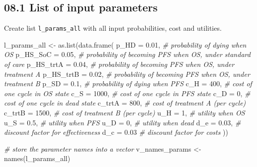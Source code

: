\documentclass[
]{article}
\newenvironment{Shaded}{\begin{snugshade}}{\end{snugshade}}
\newcommand{\AttributeTok}[1]{\textcolor[rgb]{0.77,0.63,0.00}{#1}}
\newcommand{\CommentTok}[1]{\textcolor[rgb]{0.56,0.35,0.01}{\textit{#1}}}
\newcommand{\DecValTok}[1]{\textcolor[rgb]{0.00,0.00,0.81}{#1}}
\newcommand{\FloatTok}[1]{\textcolor[rgb]{0.00,0.00,0.81}{#1}}
\newcommand{\FunctionTok}[1]{\textcolor[rgb]{0.00,0.00,0.00}{#1}}
\newcommand{\NormalTok}[1]{#1}
\newcommand{\OtherTok}[1]{\textcolor[rgb]{0.56,0.35,0.01}{#1}}
\begin{document}
\hypertarget{list-of-input-parameters}{%
\subsection{08.1 List of input
parameters}\label{list-of-input-parameters}}

Create list \texttt{l\_params\_all} with all input probabilities, cost
and utilities.

\begin{Shaded}
\begin{Highlighting}[]
\NormalTok{l\_params\_all }\OtherTok{\textless{}{-}} \FunctionTok{as.list}\NormalTok{(}\FunctionTok{data.frame}\NormalTok{(}
  \AttributeTok{p\_HD      =} \FloatTok{0.01}\NormalTok{,  }\CommentTok{\# probability of dying when OS}
  \AttributeTok{p\_HS\_SoC  =} \FloatTok{0.05}\NormalTok{,  }\CommentTok{\# probability of becoming PFS when OS, under standard of care}
  \AttributeTok{p\_HS\_trtA =} \FloatTok{0.04}\NormalTok{,  }\CommentTok{\# probability of becoming PFS when OS, under treatment A}
  \AttributeTok{p\_HS\_trtB =} \FloatTok{0.02}\NormalTok{,  }\CommentTok{\# probability of becoming PFS when OS, under treatment B}
  \AttributeTok{p\_SD      =} \FloatTok{0.1}\NormalTok{,   }\CommentTok{\# probability of dying when PFS}
  \AttributeTok{c\_H       =} \DecValTok{400}\NormalTok{,   }\CommentTok{\# cost of one cycle in OS state}
  \AttributeTok{c\_S       =} \DecValTok{1000}\NormalTok{,  }\CommentTok{\# cost of one cycle in PFS state}
  \AttributeTok{c\_D       =} \DecValTok{0}\NormalTok{,     }\CommentTok{\# cost of one cycle in dead state}
  \AttributeTok{c\_trtA    =} \DecValTok{800}\NormalTok{,   }\CommentTok{\# cost of treatment A (per cycle)}
  \AttributeTok{c\_trtB    =} \DecValTok{1500}\NormalTok{,  }\CommentTok{\# cost of treatment B (per cycle)}
  \AttributeTok{u\_H       =} \DecValTok{1}\NormalTok{,     }\CommentTok{\# utility when OS }
  \AttributeTok{u\_S       =} \FloatTok{0.5}\NormalTok{,   }\CommentTok{\# utility when PFS}
  \AttributeTok{u\_D       =} \DecValTok{0}\NormalTok{,     }\CommentTok{\# utility when dead}
  \AttributeTok{d\_e       =} \FloatTok{0.03}\NormalTok{,  }\CommentTok{\# discount factor for effectiveness}
  \AttributeTok{d\_c       =} \FloatTok{0.03}   \CommentTok{\# discount factor for costs}
\NormalTok{))}

\CommentTok{\# store the parameter names into a vector}
\NormalTok{v\_names\_params }\OtherTok{\textless{}{-}} \FunctionTok{names}\NormalTok{(l\_params\_all)}
\end{Highlighting}
\end{Shaded}
\end{document}
